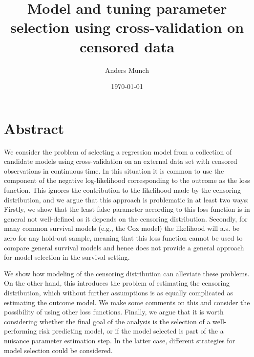 \documentclass[11pt]{article}
\author{Anders Munch}
\date{\today}
\title{Model and tuning parameter selection using cross-validation on censored data}
\begin{document}
\maketitle

\section{Abstract}
\label{sec:orge250621}
We consider the problem of selecting a regression model from a collection of candidate models using
cross-validation on an external data set with censored observations in continuous time. In this
situation it is common to use the component of the negative log-likelihood corresponding to the
outcome as the loss function. This ignores the contribution to the likelihood made by the censoring
distribution, and we argue that this approach is problematic in at least two ways: Firstly, we show
that the least false parameter according to this loss function is in general not well-defined as it
depends on the censoring distribution. Secondly, for many common survival models (e.g., the Cox
model) the likelihood will a.s. be zero for any hold-out sample, meaning that this loss function
cannot be used to compare general survival models and hence does not provide a general approach for
model selection in the survival setting.

We show how modeling of the censoring distribution can alleviate these problems. On the other hand,
this introduces the problem of estimating the censoring distribution, which without further
assumptions is as equally complicated as estimating the outcome model. We make some comments on this
and consider the possibility of using other loss functions. Finally, we argue that it is worth
considering whether the final goal of the analysis is the selection of a well-performing risk
predicting model, or if the model selected is part of the a nuisance parameter estimation step. In
the latter case, different strategies for model selection could be considered.
\end{document}
